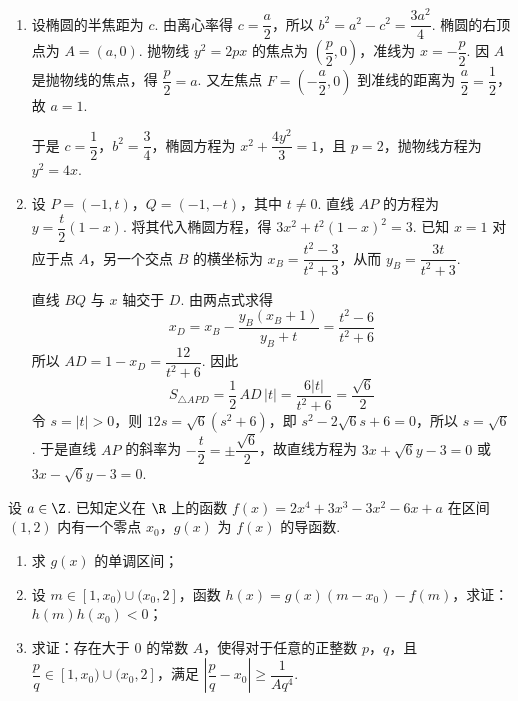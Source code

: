 \begin{solution}
\begin{enumerate}
\item 设椭圆的半焦距为 \(c\). 由离心率得 \(c=\dfrac a2\)，所以
\(b^2=a^2-c^2=\dfrac{3a^2}{4}\). 椭圆的右顶点为 \(A=(a,0)\). 抛物线
\(y^2=2px\) 的焦点为 \(\left(\dfrac p2,0\right)\)，准线为 \(x=-\dfrac p2\).
因 \(A\) 是抛物线的焦点，得 \(\dfrac p2=a\). 又左焦点
\(F=\left(-\dfrac a2,0\right)\) 到准线的距离为 \(\dfrac a2=\dfrac12\)，故 \(a=1\).

于是 \(c=\dfrac12\)，\(b^2=\dfrac34\)，椭圆方程为
\(x^2+\dfrac{4y^2}{3}=1\)，且 \(p=2\)，抛物线方程为 \(y^2=4x\).

\item 设 \(P=(-1,t)\)，\(Q=(-1,-t)\)，其中 \(t\neq0\). 直线 \(AP\) 的方程为
\(y=\dfrac t2(1-x)\). 将其代入椭圆方程，得
\(3x^2+t^2(1-x)^2=3\). 已知 \(x=1\) 对应于点 \(A\)，另一个交点 \(B\) 的横坐标为
\(x_B=\dfrac{t^2-3}{t^2+3}\)，从而 \(y_B=\dfrac{3t}{t^2+3}\).

直线 \(BQ\) 与 \(x\) 轴交于 \(D\). 由两点式求得
\[
x_D=x_B-\frac{y_B(x_B+1)}{y_B+t}=\frac{t^2-6}{t^2+6}
\]
所以 \(AD=1-x_D=\dfrac{12}{t^2+6}\). 因此
\[
S_{\triangle APD}=\frac12\,AD\,|t|=\frac{6|t|}{t^2+6}=\frac{\sqrt6}{2}
\]
令 \(s=|t|>0\)，则 \(12s=\sqrt6(s^2+6)\)，即
\(s^2-2\sqrt6s+6=0\)，所以 \(s=\sqrt6\). 于是直线 \(AP\) 的斜率为
\(-\dfrac t2=\pm\dfrac{\sqrt6}{2}\)，故直线方程为
\(3x+\sqrt6y-3=0\) 或 \(3x-\sqrt6y-3=0\).
\end{enumerate}
\end{solution}

\begin{problem}
设 \(a\in\Z\). 已知定义在 \(\R\) 上的函数 \(f(x)=2x^4+3x^3-3x^2-6x+a\) 在区间 \((1,2)\) 内有一个零点 \(x_0\)，\(g(x)\) 为 \(f(x)\) 的导函数.

\begin{enumerate}
\item 求 \(g(x)\) 的单调区间；
\item 设 \(m\in[1,x_0)\cup(x_0,2]\)，函数 \(h(x)=g(x)(m-x_0)-f(m)\)，求证：\(h(m)h(x_0)<0\)；
\item 求证：存在大于 \(0\) 的常数 \(A\)，使得对于任意的正整数 \(p\)，\(q\)，且 \(\dfrac{p}{q}\in[1,x_0)\cup(x_0,2]\)，满足 \(\left|\dfrac{p}{q}-x_0\right|\ge \dfrac{1}{Aq^4}\).
\end{enumerate}
\end{problem}

